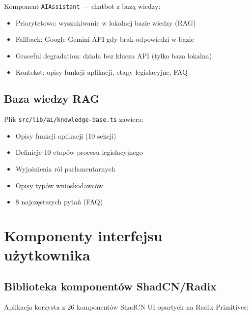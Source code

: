 \documentclass[12pt,a4paper]{article}
\begin{document}
Komponent \texttt{AIAssistant} — chatbot z bazą wiedzy:

\begin{itemize}[leftmargin=2em]
  \item Priorytetowo: wyszukiwanie w lokalnej bazie wiedzy (RAG)
  \item Fallback: Google Gemini API gdy brak odpowiedzi w bazie
  \item Graceful degradation: działa bez klucza API (tylko baza lokalna)
  \item Kontekst: opisy funkcji aplikacji, etapy legislacyjne, FAQ
\end{itemize}

\subsection{Baza wiedzy RAG}

Plik \texttt{src/lib/ai/knowledge-base.ts} zawiera:

\begin{itemize}[leftmargin=2em]
  \item Opisy funkcji aplikacji (10 sekcji)
  \item Definicje 10 etapów procesu legislacyjnego
  \item Wyjaśnienia ról parlamentarnych
  \item Opisy typów wnioskodawców
  \item 8 najczęstszych pytań (FAQ)
\end{itemize}

\newpage

\section{Komponenty interfejsu użytkownika}

\subsection{Biblioteka komponentów ShadCN/Radix}

Aplikacja korzysta z 26 komponentów ShadCN UI opartych na Radix Primitives:
\end{document}
